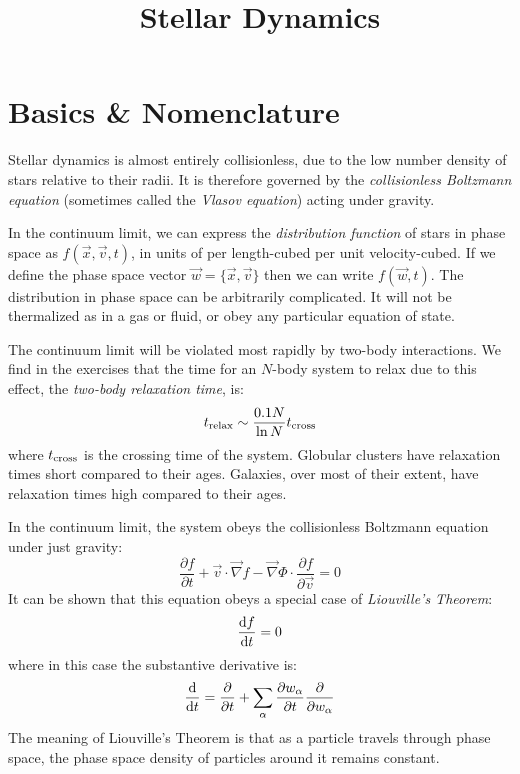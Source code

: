 \title{\bf Stellar Dynamics}


\section{Basics \& Nomenclature}

Stellar dynamics is almost entirely collisionless, due to the low
number density of stars relative to their radii. It is therefore
governed by the {\it collisionless Boltzmann equation} (sometimes
called the {\it Vlasov equation}) acting under gravity.

In the continuum limit, we can express the {\it distribution function}
of stars in phase space as $f(\vec{x}, \vec{v}, t)$, in units of per
length-cubed per unit velocity-cubed. If we define the phase space
vector $\vec{w} = \{\vec{x}, \vec{v}\}$ then we can write $f(\vec{w},
t)$. The distribution in phase space can be arbitrarily
complicated. It will not be thermalized as in a gas or fluid, or obey
any particular equation of state.

The continuum limit will be violated most rapidly by two-body
interactions. We find in the exercises that the time for an $N$-body
system to relax due to this effect, the {\it two-body relaxation
time}, is:
\begin{equation}
\label{eq:relax}
t_{\rm relax} \sim \frac{0.1 N}{\ln N} t_{\rm cross}
\end{equation}
where $t_{\rm cross}$ is the crossing time of the system. Globular
clusters have relaxation times short compared to their ages.
Galaxies, over most of their extent, have relaxation times high
compared to their ages.

In the continuum limit, the system obeys the collisionless Boltzmann
equation under just gravity:
\begin{equation}
 \frac{\partial f}{\partial t} + \vec{v}\cdot\vec{\nabla} f -
\vec{\nabla}\Phi\cdot\frac{\partial f}{\partial \vec{v}} = 0
\end{equation}
It can be shown that this equation obeys a special case of {\it
Liouville's Theorem}:
\begin{equation}
\frac{{\rm d}f}{{\rm d}t} = 0
\end{equation}
where in this case the substantive derivative is:
\begin{equation}
\frac{\rm d}{{\rm d}t} = \frac{\partial}{\partial t}
+ \sum_\alpha \frac{\partial w_\alpha}{\partial t} \frac{\partial}{\partial w_\alpha}
\end{equation}
The meaning of Liouville's Theorem is that as a particle travels
through phase space, the phase space density of particles around it
remains constant.

